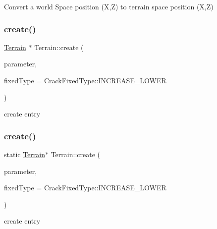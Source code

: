 Convert a world Space position (X,Z) to terrain space position (X,Z) \mbox{\label{classTerrain_a5e5cf615b8942d8d26f2d09de7f6ce04}} 
\subsubsection{\texorpdfstring{create()}{create()}\hspace{0.1cm}{\footnotesize\ttfamily [1/2]}}
{\footnotesize\ttfamily \hyperlink{classTerrain}{Terrain} $\ast$ Terrain\+::create (\begin{DoxyParamCaption}\item[{\hyperlink{structTerrain_1_1TerrainData}{Terrain\+Data} \&}]{parameter,  }\item[{\hyperlink{classTerrain_af3dc2d6c44474fdbd9552d69e553ef93}{Crack\+Fixed\+Type}}]{fixed\+Type = {\ttfamily CrackFixedType\+:\+:INCREASE\+\_\+LOWER} }\end{DoxyParamCaption})\hspace{0.3cm}{\ttfamily [static]}}

create entry \mbox{\label{classTerrain_ab4ba510e2bcb3566177f62471870cdc1}} 
\subsubsection{\texorpdfstring{create()}{create()}\hspace{0.1cm}{\footnotesize\ttfamily [2/2]}}
{\footnotesize\ttfamily static \hyperlink{classTerrain}{Terrain}$\ast$ Terrain\+::create (\begin{DoxyParamCaption}\item[{\hyperlink{structTerrain_1_1TerrainData}{Terrain\+Data} \&}]{parameter,  }\item[{\hyperlink{classTerrain_af3dc2d6c44474fdbd9552d69e553ef93}{Crack\+Fixed\+Type}}]{fixed\+Type = {\ttfamily CrackFixedType\+:\+:INCREASE\+\_\+LOWER} }\end{DoxyParamCaption})\hspace{0.3cm}{\ttfamily [static]}}

create entry \mbox{\label{classTerrain_a3bd1ac6219e1bfe32e7da26e9ab58646}} 
